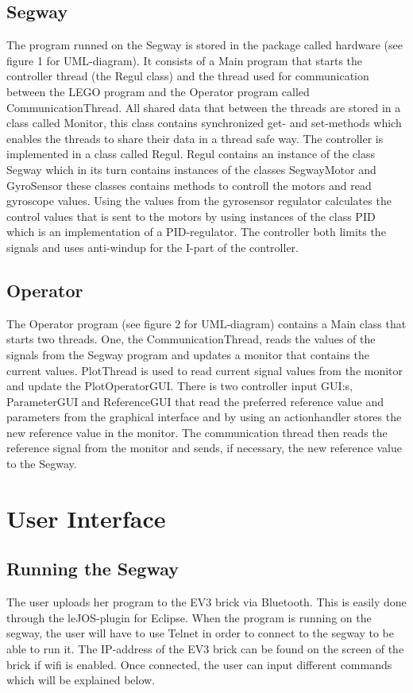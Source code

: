 \subsection{Segway}
The program runned on the Segway is stored in the package called hardware (see figure 1 for UML-diagram). It consists of a Main program that starts the controller thread (the Regul class) and the thread used for communication between the LEGO program and the Operator program called CommunicationThread. All shared data that between the threads are stored in a class called Monitor, this class contains synchronized get- and set-methods which enables the threads to share their data in a thread safe way. The controller is implemented in a class called Regul. Regul contains an instance of the class Segway which in its turn contains instances of the classes SegwayMotor and GyroSensor these classes contains methods to controll the motors and read gyroscope values. Using the values from the gyrosensor regulator calculates the control values that is sent to the motors by using instances of the class PID which is an implementation of a PID-regulator. The controller both limits the signals and uses anti-windup for the I-part of the controller. 


\subsection{Operator}
The Operator program (see figure 2 for UML-diagram)  contains a Main class that starts two threads. One, the CommunicationThread, reads the values of the signals from the Segway program and updates a monitor that contains the current values. PlotThread is used to read current signal values from the monitor and update the PlotOperatorGUI. There is two controller input GUI:s, ParameterGUI and ReferenceGUI that read the preferred reference value and parameters from the graphical interface and by using an actionhandler stores the new reference value in the monitor. The communication thread then reads the reference signal from the monitor and sends, if necessary, the new reference value to the Segway.

\section{User Interface}

\subsection{Running the Segway}
The user uploads her program to the EV3 brick via Bluetooth. This is easily done through the leJOS-plugin for Eclipse. When the program is running on the segway, the user will have to use Telnet in order to connect to the segway to be able to run it. The IP-address of the EV3 brick can be found on the screen of the brick if wifi is enabled. Once connected, the user can input different commands which will be explained below.

